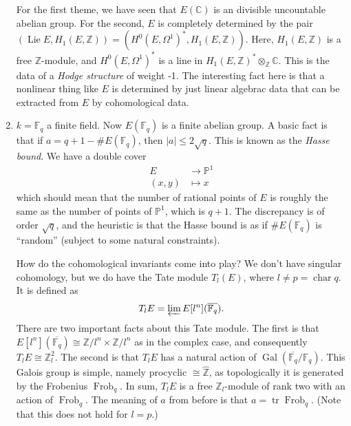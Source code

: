 \begin{enumerate}
  For the first theme, we have seen that \( E(\mathbb{C}) \) is an divisible uncountable abelian group.
  For the second, \( E \) is completely determined by the pair \( \left( \operatorname{Lie} E, H_1 \left( E,\mathbb{Z} \right) \right) = \left( H^0 \left( E,\Omega^1 \right)^*,H_1 \left( E,\mathbb{Z} \right) \right) \).
  Here, \( H_1 \left( E,\mathbb{Z} \right) \) is a free \( \mathbb{Z} \)-module, and \( H^0 \left( E,\Omega^1 \right)^* \) is a line in \( H_1 \left( E,\mathbb{Z} \right)^* \otimes_{\mathbb{Z}} \mathbb{C} \).
  This is the data of a \textit{Hodge structure} of weight -1.
  The interesting fact here is that a nonlinear thing like \( E \) is determined by just linear algebrac data that can be extracted from \( E \) by cohomological data.
\item \( k = \mathbb{F}_q \) a finite field.
  Now \( E(\mathbb{F}_q) \) is a finite abelian group.
  A basic fact is that if \( a = q + 1 - \# E(\mathbb{F}_q) \), then \( |a| \leq 2 \sqrt{q} \).
  This is known as the \textit{Hasse bound}.
  We have a double cover
  \begin{align*}
    E & \to \mathbb{P}^1 \\
    (x,y) & \mapsto x
  \end{align*}
  which should mean that the number of rational points of \( E \) is roughly the same as the number of points of \( \mathbb{P}^1 \), which is \( q+1 \).
  The discrepancy is of order \( \sqrt{q} \), and the heuristic is that the Hasse bound is as if \( \# E(\mathbb{F}_q) \) is ``random'' (subject to some natural constraints).

  How do the cohomological invariants come into play?
  We don't have singular cohomology, but we do have the Tate module \( T_l(E) \), where \( l \neq p = \operatorname{char} q \).
  It is defined as \[ T_l E = \varprojlim E[l^n]( \overline{\mathbb{F}_q} ) . \]
  There are two important facts about this Tate module.
  The first is that \( E[l^n] \left( \overline{\mathbb{F}_q} \right) \cong \mathbb{Z}/l^n \times \mathbb{Z}/l^n \) as in the complex case, and consequently \( T_l E \cong \mathbb{Z}_l^2 \).
  The second is that \( T_l E \) has a natural action of \( \operatorname{Gal} \left( \overline{\mathbb{F}_q}/ \mathbb{F}_q \right) \).
  This Galois group is simple, namely procyclic \( \cong \hat{\mathbb{Z}} \), as topologically it is generated by the Frobenius \( \operatorname{Frob}_q \).
  In sum, \( T_l E \) is a free \( \mathbb{Z}_l \)-module of rank two with an action of \( \operatorname{Frob}_q \).
  The meaning of \( a \) from before is that \( a = \operatorname{tr} \operatorname{Frob}_q \).
  (Note that this does not hold for \( l = p \).)


\end{enumerate}
